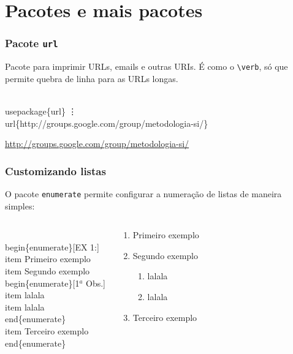 \documentclass{beamer}
\newcommand{\pacote}[1]{\texttt{\textcolor[rgb]{0.3,0.6,0}{#1}}}
\begin{document}
\section{Pacotes e mais pacotes}

\begin{frame}[fragile]
\frametitle{Pacote \texttt{url}}

Pacote para imprimir URLs, emails e outras URIs. É como o \verb!\verb!, só que permite quebra de linha para as URLs longas. 

\begin{semiverbatim}
\\usepackage\{url\}
\vdots 
\\url\{http://groups.google.com/group/metodologia-si/\}
\end{semiverbatim}
\url{http://groups.google.com/group/metodologia-si/} 
\end{frame}

\begin{frame}[fragile]
\frametitle{Customizando listas}

O pacote \pacote{enumerate} permite configurar a numeração de listas de maneira simples:


	\begin{columns}
			\begin{footnotesize}
			\begin{semiverbatim}
			\\begin\{enumerate\}[EX 1:]
			\\item Primeiro exemplo
			\\item Segundo exemplo
				\\begin\{enumerate\}[1$^{a}$ Obs.]
				\\item lalala
				\\item lalala
				\\end\{enumerate\}
			\\item Terceiro exemplo
			\\end\{enumerate\}
			\end{semiverbatim}
			\end{footnotesize}

			\begin{small}
			\begin{enumerate}[EX 1:]
			\item Primeiro exemplo
			\item Segundo exemplo
				\begin{enumerate}[1$^{a}$ Obs.]
				\item lalala
				\item lalala
				\end{enumerate}
			\item Terceiro exemplo
			\end{enumerate}
			\end{small}
	\end{columns}



\end{frame}
\end{document}
